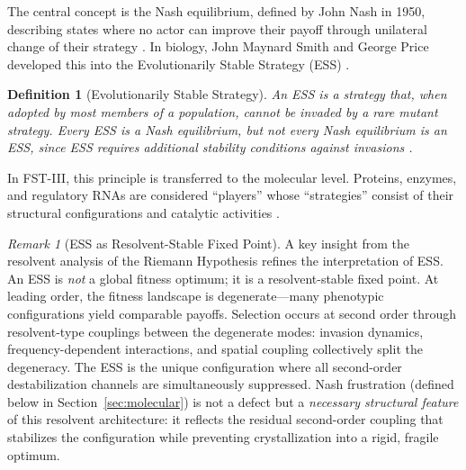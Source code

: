 \documentclass[12pt,a4paper]{article}
\newtheorem{definition}{Definition}
\theoremstyle{remark}
\newtheorem{remark}{Remark}
\begin{document}
The central concept is the Nash equilibrium, defined by John Nash in 1950, describing states where no actor can improve their payoff through unilateral change of their strategy \citep{NashPNAS,NashSFI}. In biology, John Maynard Smith and George Price developed this into the Evolutionarily Stable Strategy (ESS) \citep{MaynardSmithPrice1973,MaynardSmith1982}.

\begin{definition}[Evolutionarily Stable Strategy]
An ESS is a strategy that, when adopted by most members of a population, cannot be invaded by a rare mutant strategy. Every ESS is a Nash equilibrium, but not every Nash equilibrium is an ESS, since ESS requires additional stability conditions against invasions \citep{MaynardSmith1982}.
\end{definition}

In FST-III, this principle is transferred to the molecular level. Proteins, enzymes, and regulatory RNAs are considered ``players'' whose ``strategies'' consist of their structural configurations and catalytic activities \citep{GameBiochemistry}.

\begin{remark}[ESS as Resolvent-Stable Fixed Point]
\label{rem:ess-resolvent}
A key insight from the resolvent analysis of the Riemann Hypothesis \citep{GeigerRH2026b} refines the interpretation of ESS. An ESS is \emph{not} a global fitness optimum; it is a resolvent-stable fixed point. At leading order, the fitness landscape is degenerate---many phenotypic configurations yield comparable payoffs. Selection occurs at second order through resolvent-type couplings between the degenerate modes: invasion dynamics, frequency-dependent interactions, and spatial coupling collectively split the degeneracy. The ESS is the unique configuration where all second-order destabilization channels are simultaneously suppressed. Nash frustration (defined below in Section~\ref{sec:molecular}) is not a defect but a \emph{necessary structural feature} of this resolvent architecture: it reflects the residual second-order coupling that stabilizes the configuration while preventing crystallization into a rigid, fragile optimum.
\end{remark}
\end{document}
